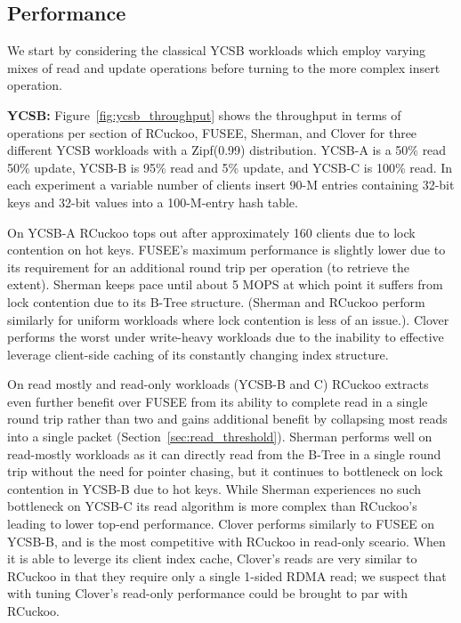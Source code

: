 \subsection{Performance}

We start by considering the classical YCSB workloads which employ
varying mixes of read and update operations before turning to the
more complex insert operation.

\textbf{YCSB:}
Figure~\ref{fig:ycsb_throughput} shows the throughput in terms of
operations per section of RCuckoo, FUSEE, Sherman, and Clover for
three different YCSB workloads with a Zipf(0.99) distribution. YCSB-A
is a 50\% read 50\% update, YCSB-B is 95\% read and 5\% update, and
YCSB-C is 100\% read.  In each experiment a variable number of clients
insert 90-M entries containing 32-bit keys and 32-bit values into a
100-M-entry hash table.


On YCSB-A RCuckoo tops out after approximately 160 clients due to lock
contention on hot keys.  FUSEE's maximum performance is slightly lower
due to its requirement for an additional round trip per operation (to
retrieve the extent). Sherman keeps pace until about 5 MOPS at which
point it suffers from lock contention due to its B-Tree structure.
(Sherman and RCuckoo perform similarly for uniform workloads where
lock contention is less of an issue.).  Clover performs the worst
under write-heavy workloads due to the inability to effective leverage
client-side caching of its constantly changing index structure.

On read mostly and read-only workloads (YCSB-B and C)
RCuckoo extracts even further benefit over FUSEE from its ability to
complete read in a single round trip rather than two and gains
additional benefit by collapsing most reads into a single packet
(Section~\ref{sec:read_threshold}).  Sherman performs well on
read-mostly workloads as it can directly read from the B-Tree in a
single round trip without the need for pointer chasing, but it
continues to bottleneck on lock contention in YCSB-B due to hot
keys. While Sherman experiences no such bottleneck on YCSB-C its read
algorithm is more complex than RCuckoo's leading to lower top-end
performance. Clover performs similarly to FUSEE on YCSB-B, and is the
most competitive with RCuckoo in read-only sceario.  When it is able
to leverge its client index cache, Clover's reads are very similar to
RCuckoo in that they require only a single 1-sided RDMA read;  we
suspect that with tuning Clover's read-only performance
could be brought to par with RCuckoo.

